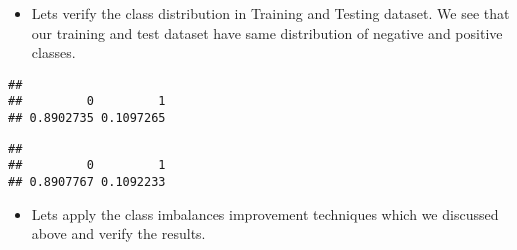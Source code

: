 \documentclass[
]{article}
\newenvironment{Shaded}{\begin{snugshade}}{\end{snugshade}}
\newcommand{\DataTypeTok}[1]{\textcolor[rgb]{0.13,0.29,0.53}{#1}}
\newcommand{\FloatTok}[1]{\textcolor[rgb]{0.00,0.00,0.81}{#1}}
\newcommand{\KeywordTok}[1]{\textcolor[rgb]{0.13,0.29,0.53}{\textbf{#1}}}
\newcommand{\NormalTok}[1]{#1}
\newcommand{\OperatorTok}[1]{\textcolor[rgb]{0.81,0.36,0.00}{\textbf{#1}}}
\newcommand{\OtherTok}[1]{\textcolor[rgb]{0.56,0.35,0.01}{#1}}
\newcommand{\StringTok}[1]{\textcolor[rgb]{0.31,0.60,0.02}{#1}}
\providecommand{\tightlist}{%
  \setlength{\itemsep}{0pt}\setlength{\parskip}{0pt}}
\begin{document}
\begin{Shaded}
\end{Shaded}

\begin{itemize}
\tightlist
\item
  Lets verify the class distribution in Training and Testing dataset. We
  see that our training and test dataset have same distribution of
  negative and positive classes.
\end{itemize}

\begin{Shaded}
\end{Shaded}

\begin{verbatim}
## 
##         0         1 
## 0.8902735 0.1097265
\end{verbatim}

\begin{Shaded}
\end{Shaded}

\begin{verbatim}
## 
##         0         1 
## 0.8907767 0.1092233
\end{verbatim}

\begin{itemize}
\tightlist
\item
  Lets apply the class imbalances improvement techniques which we
  discussed above and verify the results.
\end{itemize}

\begin{Shaded}
\end{Shaded}
\end{document}
